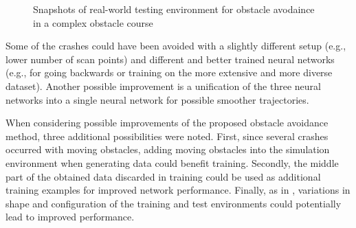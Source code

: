 \begin{figure}
    \centering
    \vfill
    \hfill
    \caption{Snapshots of real-world testing environment for obstacle avodaince in a complex obstacle course}
    \label{fig:ObstacleCourseSnap}
\end{figure}

Some of the crashes could have been avoided with a slightly different setup (e.g., lower number of scan points) and different and better trained neural networks (e.g., for going backwards or training on the more extensive and more diverse dataset). Another possible improvement is a unification of the three neural networks into a single neural network for possible smoother trajectories. 

When considering possible improvements of the proposed obstacle avoidance method, three additional possibilities were noted. First, since several crashes occurred with moving obstacles, adding moving obstacles into the simulation environment when generating data could benefit training. Secondly, the middle part of the obtained data discarded in training could be used as additional training examples for improved network performance. Finally, as in \cite{Zhu2017}, variations in shape and configuration of the training and test environments could potentially lead to improved performance.

